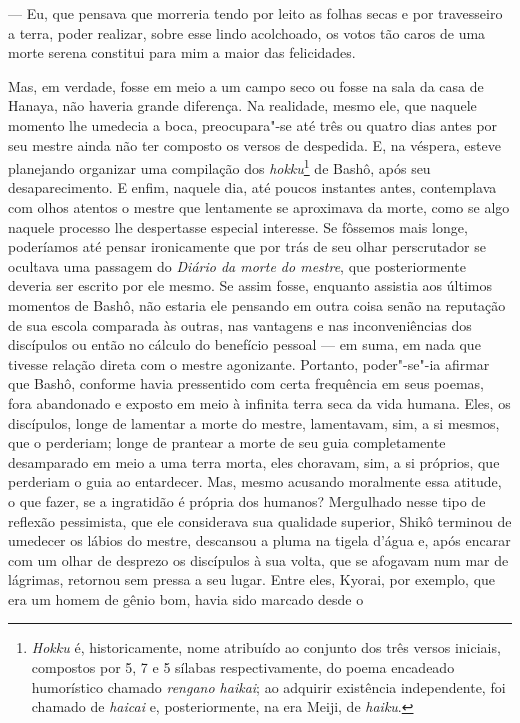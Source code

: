 --- Eu, que pensava que morreria tendo por leito as folhas secas e por
travesseiro a terra, poder realizar, sobre esse lindo acolchoado, os
votos tão caros de uma morte serena constitui para mim a maior das
felicidades.

Mas, em verdade, fosse em meio a um campo seco ou fosse na sala da casa
de Hanaya, não haveria grande diferença. Na realidade, mesmo ele, que
naquele momento lhe umedecia a boca, preocupara"-se até três ou quatro
dias antes por seu mestre ainda não ter composto os versos de
despedida. E, na véspera, esteve planejando organizar uma compilação
dos \textit{hokku}\footnote{ \textit{Hokku} é, historicamente, nome
atribuído ao conjunto dos três versos iniciais, compostos por 5, 7 e 5
sílabas respectivamente, do poema encadeado humorístico chamado
\textit{rengano haikai}; ao adquirir existência independente, foi
chamado de \emph{haicai} e, posteriormente, na era Meiji, de \textit{haiku}.}
de Bashô, após seu desaparecimento. E enfim, naquele dia, até poucos
instantes antes, contemplava com olhos atentos o mestre que lentamente
se aproximava da morte, como se algo naquele processo lhe despertasse
especial interesse. Se fôssemos mais longe, poderíamos até pensar
ironicamente que por trás de seu olhar perscrutador se ocultava uma
passagem do \textit{Diário da morte do mestre}, que posteriormente
deveria ser escrito por ele mesmo. Se assim fosse, enquanto assistia
aos últimos momentos de Bashô, não estaria ele pensando em outra coisa
senão na reputação de sua escola comparada às outras, nas vantagens e
nas inconveniências dos discípulos ou então no cálculo do benefício
pessoal --- em suma, em nada que tivesse relação direta com o mestre
agonizante. Portanto, poder"-se"-ia afirmar que Bashô, conforme havia
pressentido com certa frequência em seus poemas, fora abandonado e
exposto em meio à infinita terra seca da vida humana. Eles, os
discípulos, longe de lamentar a morte do mestre, lamentavam, sim, a si
mesmos, que o perderiam; longe de prantear a morte de seu guia
completamente desamparado em meio a uma terra morta, eles choravam,
sim, a si próprios, que perderiam o guia ao entardecer. Mas, mesmo
acusando moralmente essa atitude, o que fazer, se a ingratidão é
própria dos humanos? Mergulhado nesse tipo de reflexão pessimista, que
ele considerava sua qualidade superior, Shikô terminou de umedecer
os lábios do mestre, descansou a pluma na tigela d'água e, após encarar
com um olhar de desprezo os discípulos à sua volta, que se afogavam num
mar de lágrimas, retornou sem pressa a seu lugar. Entre eles, Kyorai,
por exemplo, que era um homem de gênio bom, havia sido marcado desde o
